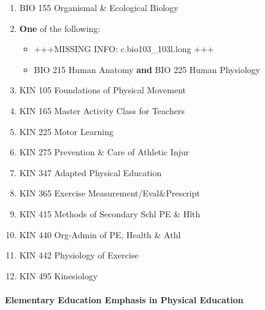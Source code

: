 \documentclass[
  letterpaper,
]{scrbook}
\providecommand{\tightlist}{%
  \setlength{\itemsep}{0pt}\setlength{\parskip}{0pt}}
\let\oldparagraph\paragraph
\renewcommand{\paragraph}[1]{\oldparagraph{#1}\mbox{}}
\begin{document}
\begin{enumerate}
\def\labelenumi{\arabic{enumi}.}
\tightlist
\item
  BIO 155 Organismal \& Ecological Biology\\
\item
  \textbf{One} of the following:

  \begin{itemize}
  \tightlist
  \item
    +++MISSING INFO: c.bio103\_103l.long +++\\
  \item
    BIO 215 Human Anatomy \textbf{and} BIO 225 Human Physiology\\
  \end{itemize}
\item
  KIN 105 Foundations of Physical Movement\\
\item
  KIN 165 Master Activity Class for Teachers\\
\item
  KIN 225 Motor Learning\\
\item
  KIN 275 Prevention \& Care of Athletic Injur\\
\item
  KIN 347 Adapted Physical Education\\
\item
  KIN 365 Exercise Measurement/Eval\&Prescript\\
\item
  KIN 415 Methods of Secondary Schl PE \& Hlth\\
\item
  KIN 440 Org-Admin of PE, Health \& Athl\\
\item
  KIN 442 Physiology of Exercise\\
\item
  KIN 495 Kinesiology
\end{enumerate}

\paragraph{Elementary Education Emphasis in Physical
Education}\label{elementary-education-emphasis-in-physical-education}
\end{document}
